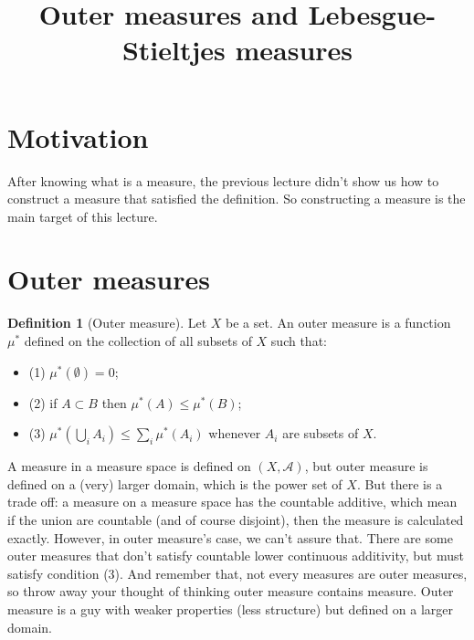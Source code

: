 \documentclass[11pt,a4paper]{article}
\title{\textbf{Outer measures and Lebesgue-Stieltjes measures}}
\theoremstyle{definition}
\newtheorem{definition}{Definition}[section]
\theoremstyle{plain}
\newcommand{\A}{\mathcal{A}}
\begin{document}
\maketitle
\tableofcontents
\newpage

\section{Motivation}

\begin{mynote}
After knowing what is a measure, the previous lecture didn't show us how to construct a measure that satisfied the definition. So constructing a measure is the main target of this lecture.
\end{mynote}

\section{Outer measures}
\begin{definition}[Outer measure]
Let $X$ be a set. An outer measure is a function $\mu^*$ defined on the collection of all subsets of $X$ such that:
\begin{itemize}
    \item (1) $\mu^*(\emptyset) = 0$;
    \item (2) if $A \subset B$ then $\mu^*(A) \le \mu^*(B)$;
    \item (3) $\mu^*(\bigcup_iA_i) \le \sum_i\mu^*(A_i)$ whenever $A_i$ are subsets of $X$.
\end{itemize}
\end{definition}

\begin{mynote}
A measure in a measure space is defined on $(X, \A)$, but outer measure is defined on a (very) larger domain, which is the power set of $X$. But there is a trade off: a measure on a measure space has the countable additive, which mean if the union are countable (and of course disjoint), then the measure is calculated exactly. However, in outer measure's case, we can't assure that. There are some outer measures that don't satisfy countable lower continuous additivity, but must satisfy condition (3). And remember that, not every measures are outer measures, so throw away your thought of thinking outer measure contains measure. Outer measure is a guy with weaker properties (less structure) but defined on a larger domain.
\end{mynote}
\end{document}
